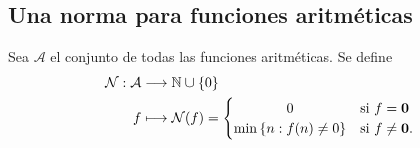\subsection{Una norma para funciones aritméticas}

\begin{definition}
Sea $\mathcal{A}$ el conjunto de todas las funciones aritméticas. Se define
\begin{align*}
    \mathcal{N} : \mathcal{A} & \longrightarrow \mathbb{N} \cup \{0\} \\
	   f & \longmapsto \mathcal{N}(f)=
	   \begin{cases}
           \hfil 0 & \textnormal{si } f=\mathbf{0} \\ \hfil
           \min \left\{n : f(n)\neq 0\right\} & \textnormal{si } f \neq \mathbf{0}.
       \end{cases}
\end{align*}
\end{definition}

